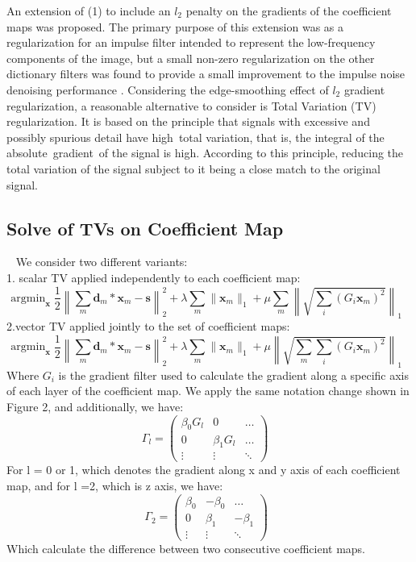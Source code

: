 \documentclass[a4paper,11pt]{article}
\begin{document}
An extension of (1) to include an $l_{2}$ penalty on the gradients of the coefficient maps was proposed\cite{DBLP:journals/corr/Wohlberg17a}. The primary purpose of this extension was as a regularization for an impulse filter intended to represent the low-frequency components of the image, but a small non-zero regularization on the other dictionary filters was found to provide a small improvement to the impulse noise denoising performance . Considering the edge-smoothing effect of $l_{2}$ gradient regularization, a reasonable alternative to consider is Total Variation (TV) regularization. 
It is based on the principle that signals with excessive and possibly spurious detail have high total variation, that is, the integral of the absolute gradient of the signal is high. According to this principle, reducing the total variation of the signal subject to it being a close match to the original signal.\\
\subsection{Solve of TVs on Coefficient Map}~
We consider two different variants\cite{sporco}:\\
1. scalar TV applied independently to each coefficient map:\\
$$ \mathrm{argmin}_\mathbf{x} \; \frac{1}{2}
       \left\| \sum_m \mathbf{d}_m * \mathbf{x}_m - \mathbf{s}
       \right\|_2^2 + \lambda \sum_m \| \mathbf{x}_m \|_1 +
       \mu \sum_m \left\| \sqrt{\sum_i (G_i \mathbf{x}_m)^2} \right\|_1
       \;\;$$
2.vector TV\cite{Blomgren:1998:CTT:2318958.2319497} applied jointly to the set of coefficient maps:\\
$$ \mathrm{argmin}_\mathbf{x} \; \frac{1}{2}
       \left\| \sum_m \mathbf{d}_m * \mathbf{x}_m - \mathbf{s}
       \right\|_2^2 + \lambda \sum_m \| \mathbf{x}_m \|_1 +
       \mu \left\| \sqrt{\sum_m \sum_i (G_i \mathbf{x}_m)^2} \right\|_1
       \;\;$$       
  Where $G_i$ is the gradient filter used to calculate the gradient along a specific axis of each layer of the coefficient map. We apply the same notation change shown in Figure 2, and additionally, we have:
  $$\Gamma_l = \left( \begin{array}{ccc}
          \beta_0 G_l & 0 & \ldots \\  0 & \beta_1 G_l & \ldots \\ \vdots & \vdots & \ddots
       \end{array} \right) \;\;\
 $$ 
 For l = 0 or 1, which denotes the gradient along x and y axis of each coefficient map, and for l =2, which is z axis, we have:
$$\Gamma_2 = \left( \begin{array}{ccc}
          \beta_0  & -\beta_0 & \ldots \\  0 & \beta_1  & -\beta_1 \\ \vdots & \vdots & \ddots
       \end{array} \right) \;\;$$
       Which calculate the difference between two consecutive coefficient maps.\\
       
\end{document}
